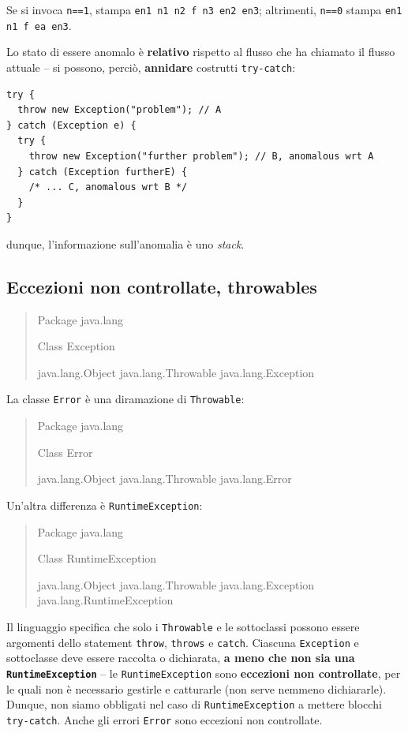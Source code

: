 \documentclass[\fontsizeclass,twocolumn]{\classname}
\theoremstyle{definition}
\theoremstyle{definition}
\begin{document}
Se si invoca \texttt{n==1}, stampa \texttt{en1 n1 n2 f n3 en2 en3}; altrimenti,
\texttt{n==0} stampa \texttt{en1 n1 f ea en3}.

Lo stato di essere anomalo è \textbf{relativo} rispetto al flusso che ha
chiamato il flusso attuale -- si possono, perciò, \textbf{annidare} costrutti
\texttt{try\--catch}:

\begin{lstlisting}
try {  
  throw new Exception("problem"); // A
} catch (Exception e) {
  try {
    throw new Exception("further problem"); // B, anomalous wrt A
  } catch (Exception furtherE) {
    /* ... C, anomalous wrt B */
  }
}
\end{lstlisting}

dunque, l'informazione sull'anomalia è uno \emph{stack}.

\subsection{Eccezioni non controllate, throwables}


\begin{quote}
    \footnotesize{Package java.lang

Class Exception

java.lang.Object
java.lang.Throwable
java.lang.Exception
}
\end{quote}

La classe \texttt{Error} è una diramazione di \texttt{Throwable}: 

\begin{quote}
    \footnotesize{Package java.lang

Class Error

java.lang.Object
java.lang.Throwable
java.lang.Error
}
\end{quote}

Un'altra differenza è \texttt{Runtime\-Exception}:

\begin{quote}
    \footnotesize{Package java.lang

Class Runtime\-Exception

java.lang.Object
java.lang.Throwable
java.lang.Exception
java.lang.Runtime\-Exception
}
\end{quote}

Il linguaggio specifica che solo i \texttt{Throwable} e le sottoclassi possono
essere argomenti dello statement \texttt{throw}, \texttt{throws} e
\texttt{catch}. Ciascuna \texttt{Exception} e sottoclasse deve essere raccolta
o dichiarata, \textbf{a meno che non sia una \texttt{Runtime\-Exception}} -- le
\texttt{Runtime\-Exception} sono \textbf{eccezioni non controllate}, per le quali
non è necessario gestirle e catturarle (non serve nemmeno dichiararle). Dunque,
non siamo obbligati nel caso di \texttt{Runtime\-Exception} a mettere blocchi
\texttt{try\--catch}. Anche gli errori \texttt{Error} sono eccezioni non
controllate.
\end{document}
